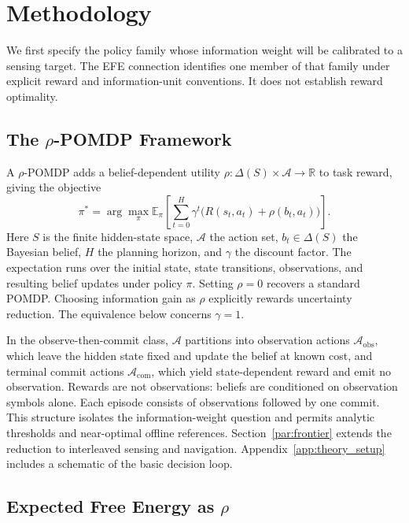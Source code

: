\section{Methodology}
\label{sec:methodology}

We first specify the policy family whose information weight will be calibrated to a sensing target. The EFE connection identifies one member of that family under explicit reward and information-unit conventions. It does not establish reward optimality.

\subsection{The $\rho$-POMDP Framework}

A $\rho$-POMDP adds a belief-dependent utility $\rho:\Delta(S)\times\mathcal{A}\to\mathbb{R}$ to task reward, giving the objective
\begin{equation}
\pi^* = \arg\max_\pi \mathbb{E}_\pi\!\left[\sum_{t=0}^{H}\gamma^t\big(R(s_t,a_t)+\rho(b_t,a_t)\big)\right].
\end{equation}
Here $S$ is the finite hidden-state space, $\mathcal A$ the action set, $b_t\in\Delta(S)$ the Bayesian belief, $H$ the planning horizon, and $\gamma$ the discount factor. The expectation runs over the initial state, state transitions, observations, and resulting belief updates under policy $\pi$. Setting $\rho=0$ recovers a standard POMDP. Choosing information gain as $\rho$ explicitly rewards uncertainty reduction. The equivalence below concerns $\gamma=1$.

In the observe-then-commit class, $\mathcal A$ partitions into observation actions $\mathcal A_{\mathrm{obs}}$, which leave the hidden state fixed and update the belief at known cost, and terminal commit actions $\mathcal A_{\mathrm{com}}$, which yield state-dependent reward and emit no observation. Rewards are not observations: beliefs are conditioned on observation symbols alone. Each episode consists of observations followed by one commit. This structure isolates the information-weight question and permits analytic thresholds and near-optimal offline references. Section~\ref{par:frontier} extends the reduction to interleaved sensing and navigation. Appendix~\ref{app:theory_setup} includes a schematic of the basic decision loop.

\subsection{Expected Free Energy as $\rho$}


